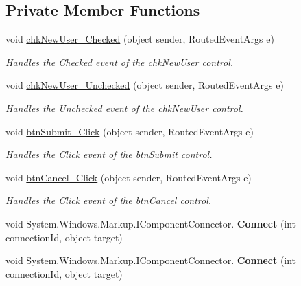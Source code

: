 \subsection*{Private Member Functions}
\begin{DoxyCompactItemize}
\item 
void \hyperlink{class_p_c_builder_forms_1_1_log_in_a42186d8ab10ba7fefbe6d93fe0686046}{chk\+New\+User\+\_\+\+Checked} (object sender, Routed\+Event\+Args e)
\begin{DoxyCompactList}\small\item\em Handles the Checked event of the chk\+New\+User control. \end{DoxyCompactList}\item 
void \hyperlink{class_p_c_builder_forms_1_1_log_in_a82887e13a948dfad13c8f33758ae2e27}{chk\+New\+User\+\_\+\+Unchecked} (object sender, Routed\+Event\+Args e)
\begin{DoxyCompactList}\small\item\em Handles the Unchecked event of the chk\+New\+User control. \end{DoxyCompactList}\item 
void \hyperlink{class_p_c_builder_forms_1_1_log_in_a5bd038fb92b73172d645fb1c0b754a25}{btn\+Submit\+\_\+\+Click} (object sender, Routed\+Event\+Args e)
\begin{DoxyCompactList}\small\item\em Handles the Click event of the btn\+Submit control. \end{DoxyCompactList}\item 
void \hyperlink{class_p_c_builder_forms_1_1_log_in_af358b3dce8bd658650e92a6974c923bb}{btn\+Cancel\+\_\+\+Click} (object sender, Routed\+Event\+Args e)
\begin{DoxyCompactList}\small\item\em Handles the Click event of the btn\+Cancel control. \end{DoxyCompactList}\item 
void System.\+Windows.\+Markup.\+I\+Component\+Connector. {\bfseries Connect} (int connection\+Id, object target)\hypertarget{class_p_c_builder_forms_1_1_log_in_ac680078b371585945fb49de677d48bfd}{}\label{class_p_c_builder_forms_1_1_log_in_ac680078b371585945fb49de677d48bfd}

\item 
void System.\+Windows.\+Markup.\+I\+Component\+Connector. {\bfseries Connect} (int connection\+Id, object target)\hypertarget{class_p_c_builder_forms_1_1_log_in_ac680078b371585945fb49de677d48bfd}{}\label{class_p_c_builder_forms_1_1_log_in_ac680078b371585945fb49de677d48bfd}

\end{DoxyCompactItemize}
